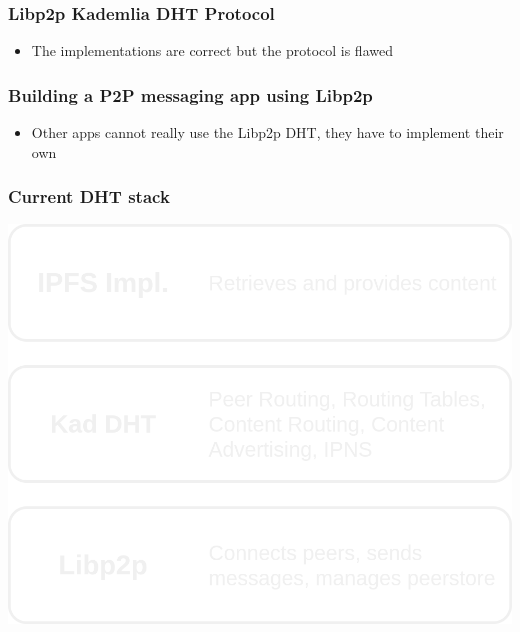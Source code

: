 \documentclass{../pl-slide}
\begin{document}
\begin{frame}
\frametitle{Libp2p Kademlia DHT Protocol}

\begin{itemize}
	\itemc IPFS-centric Kademlia implementations
	\itemc Kad DHT is the peer routing component of Libp2p
	\itemc Not future proof
	\bigskip
	\item[\greencube] The implementations are correct but the protocol is flawed
\end{itemize}
\end{frame}

\begin{frame}
\frametitle{Building a P2P messaging app using Libp2p}

\begin{itemize}
	\itemc Routing and Hole Punching using the DHT as  peer discovery mechanism 
	\itemc Feature: Rendez-vous for group chats	
	\itemc Don't want nodes to store and serve IPFS data
	\itemc If participating in the DHT but not serving IPFS data, IPFS will be hurt
	\bigskip
	\item[\greencube] Other apps cannot really use the Libp2p DHT, they have to implement their own
\end{itemize}
\end{frame}

\begin{frame}
\frametitle{Current DHT stack}
\includegraphics[scale=.2]{resources/old-dht-stack.png}
\end{frame}
\end{document}

